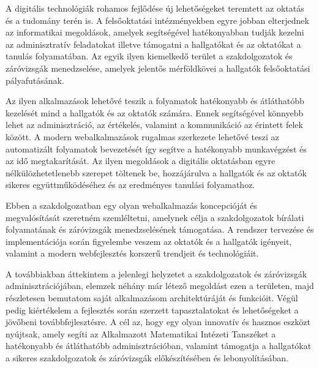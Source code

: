 
A digitális technológiák rohamos fejlődése új lehetőségeket teremtett az oktatás és a tudomány terén is. A felsőoktatási intézményekben egyre jobban elterjednek az informatikai megoldások, amelyek segítségével hatékonyabban tudják kezelni az adminisztratív feladatokat illetve támogatni a hallgatókat és az oktatókat a tanulás folyamatában. Az egyik ilyen kiemelkedő terület a szakdolgozatok és záróvizsgák menedzselése, amelyek jelentős mérföldkövei a hallgatók felsőoktatási pályafutásának.

Az ilyen alkalmazások lehetővé teszik a folyamatok hatékonyabb és átláthatóbb kezelését mind a hallgatók és az oktatók számára. Ennek segítségével könnyebb lehet az adminisztráció, az értékelés, valamint a kommunikáció az érintett felek között. A modern webalkalmazások rugalmas szerkezete lehetővé teszi az automatizált folyamatok bevezetését így segítve a hatékonyabb munkavégzést és az idő megtakarítását. Az ilyen megoldások a digitális oktatásban egyre nélkülözhetetlenebb szerepet töltenek be, hozzájárulva a hallgatók és az oktatók sikeres együttműködéséhez és az eredményes tanulási folyamathoz.

Ebben a szakdolgozatban egy olyan webalkalmazás koncepcióját és megvalósítását szeretném szemléltetni, amelynek célja a szakdolgozatok bírálati folyamatának és záróvizsgák menedzselésének támogatása. A rendszer tervezése és implementációja során figyelembe veszem az oktatók és a hallgatók igényeit, valamint a modern webfejlesztés korszerű trendjeit és technológiáit.

A továbbiakban áttekintem a jelenlegi helyzetet a szakdolgozatok és záróvizsgák adminisztrációjában, elemzek néhány már létező megoldást ezen a területen, majd részletesen bemutatom saját alkalmazásom architektúráját és funkcióit. Végül pedig kiértékelem a fejlesztés során szerzett tapasztalatokat és lehetőségeket a jövőbeni továbbfejlesztésre. A cél az, hogy egy olyan innovatív és hasznos eszközt nyújtsak, amely segíti az Alkalmazott Matematikai Intézeti Tanszéket a hatékonyabb és átláthatóbb adminisztrációban, valamint támogatja a hallgatókat a sikeres szakdolgozatok és záróvizsgák előkészítésében és lebonyolításában.